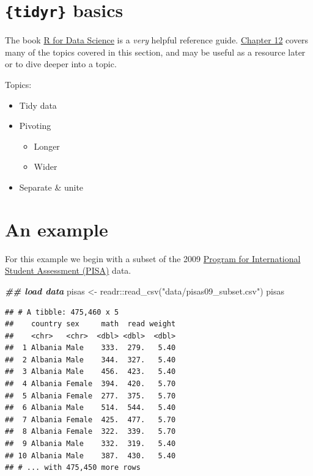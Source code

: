 \documentclass[
]{book}
\newenvironment{Shaded}{\begin{snugshade}}{\end{snugshade}}
\newcommand{\DocumentationTok}[1]{\textcolor[rgb]{0.56,0.35,0.01}{\textbf{\textit{#1}}}}
\newcommand{\FunctionTok}[1]{\textcolor[rgb]{0.00,0.00,0.00}{#1}}
\newcommand{\NormalTok}[1]{#1}
\newcommand{\OtherTok}[1]{\textcolor[rgb]{0.56,0.35,0.01}{#1}}
\newcommand{\SpecialCharTok}[1]{\textcolor[rgb]{0.00,0.00,0.00}{#1}}
\newcommand{\StringTok}[1]{\textcolor[rgb]{0.31,0.60,0.02}{#1}}
\providecommand{\tightlist}{%
  \setlength{\itemsep}{0pt}\setlength{\parskip}{0pt}}
\begin{document}
\hypertarget{tidyr-basics}{%
\section*{\texorpdfstring{\texttt{\{tidyr\}} basics}{\{tidyr\} basics}}\label{tidyr-basics}}

The book \href{https://r4ds.had.co.nz/}{R for Data Science} is a \emph{very} helpful reference guide. \href{https://r4ds.had.co.nz/tidy-data.html}{Chapter 12} covers many of the topics covered in this section, and may be useful as a resource later or to dive deeper into a topic.

Topics:

\begin{itemize}
\tightlist
\item
  Tidy data
\item
  Pivoting

  \begin{itemize}
  \tightlist
  \item
    Longer
  \item
    Wider
  \end{itemize}
\item
  Separate \& unite
\end{itemize}

\hypertarget{an-example-2}{%
\section{An example}\label{an-example-2}}

For this example we begin with a subset of the 2009 \href{https://nces.ed.gov/surveys/pisa/}{Program for International Student Assessment (PISA)} data.

\begin{Shaded}
\begin{Highlighting}[]
\DocumentationTok{\#\# load data}
\NormalTok{pisas }\OtherTok{\textless{}{-}}\NormalTok{ readr}\SpecialCharTok{::}\FunctionTok{read\_csv}\NormalTok{(}\StringTok{"data/pisas09\_subset.csv"}\NormalTok{)}
\NormalTok{pisas}
\end{Highlighting}
\end{Shaded}

\begin{verbatim}
## # A tibble: 475,460 x 5
##    country sex     math  read weight
##    <chr>   <chr>  <dbl> <dbl>  <dbl>
##  1 Albania Male    333.  279.   5.40
##  2 Albania Male    344.  327.   5.40
##  3 Albania Male    456.  423.   5.40
##  4 Albania Female  394.  420.   5.70
##  5 Albania Female  277.  375.   5.70
##  6 Albania Male    514.  544.   5.40
##  7 Albania Female  425.  477.   5.70
##  8 Albania Female  322.  339.   5.70
##  9 Albania Male    332.  319.   5.40
## 10 Albania Male    387.  430.   5.40
## # ... with 475,450 more rows
\end{verbatim}
\end{document}
